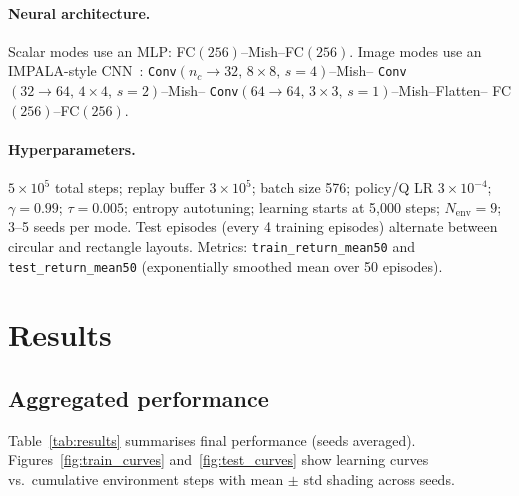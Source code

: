 \documentclass{article}
\begin{document}
\paragraph{Neural architecture.}
Scalar modes use an MLP: FC$(256)$--Mish--FC$(256)$.
Image modes use an IMPALA-style CNN~\citep{espeholt2018impala}:
\texttt{Conv}$(n_c\!\to\!32,\,8{\times}8,\,s{=}4)$--Mish--%
\texttt{Conv}$(32\!\to\!64,\,4{\times}4,\,s{=}2)$--Mish--%
\texttt{Conv}$(64\!\to\!64,\,3{\times}3,\,s{=}1)$--Mish--Flatten--%
FC$(256)$--FC$(256)$.

\paragraph{Hyperparameters.}
$5\!\times\!10^5$ total steps; replay buffer $3\!\times\!10^5$;
batch size 576; policy/Q LR $3\!\times\!10^{-4}$; $\gamma=0.99$;
$\tau=0.005$; entropy autotuning; learning starts at 5{,}000 steps;
$N_\text{env}=9$; 3--5 seeds per mode.
Test episodes (every 4 training episodes) alternate between circular and
rectangle layouts.
Metrics: \texttt{train\_return\_mean50} and \texttt{test\_return\_mean50}
(exponentially smoothed mean over 50 episodes).

\section{Results}
\label{sec:results}

\subsection{Aggregated performance}

Table~\ref{tab:results} summarises final performance (seeds averaged).
Figures~\ref{fig:train_curves} and~\ref{fig:test_curves} show learning curves
vs.\ cumulative environment steps with mean $\pm$ std shading across seeds.
\end{document}
